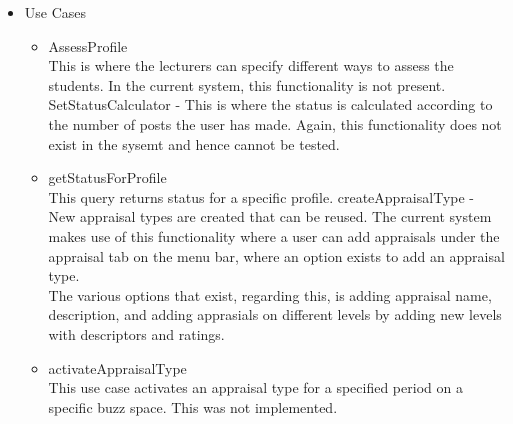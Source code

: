 \begin {itemize}
\item Use Cases
\begin {itemize}
\item {AssessProfile}\\ 
This is where the lecturers can specify different ways to assess the students. In the current system, this functionality is not present.
SetStatusCalculator - This is where the status is calculated according to the number of posts the user has made. Again, this functionality does not exist in the sysemt and hence cannot be tested. 
\end {itemize}
 
\begin {itemize}
\item {getStatusForProfile}\\ 
This query returns status for a specific profile. 
createAppraisalType - New appraisal types are created that can be reused. The current system makes use of this functionality where a user can add appraisals under the appraisal tab on the menu bar, where an option exists to add an appraisal type.\\ The various options that exist, regarding this, is adding appraisal name, description, and adding apprasials on different levels by adding new levels with descriptors and ratings. \\
\end {itemize}

\begin {itemize}
\item {activateAppraisalType}\\ 
This use case activates an appraisal type for a specified period on a specific buzz space. This was not implemented.
\end {itemize}
\end {itemize}
